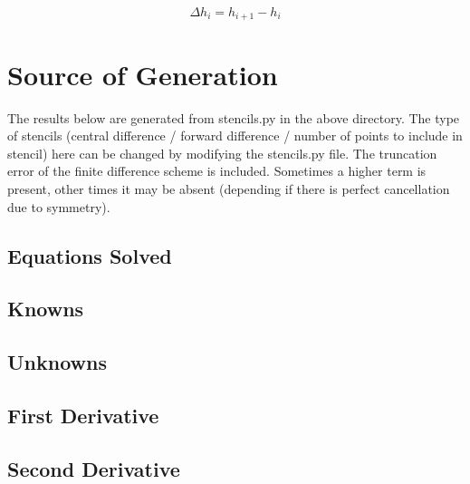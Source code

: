 \documentclass[11pt]{article}
\begin{document}
\begin{equation}
	\boxed{
	\Delta h_{i}
	=
	h_{i+1} - h_{i}
	}
\end{equation}

\section{Source of Generation}
The results below are generated from stencils.py in the above directory. The type of stencils (central difference / forward difference / number of points to include in stencil) here can be changed by modifying the stencils.py file. The truncation error of the finite difference scheme is included. Sometimes a higher term is present, other times it may be absent (depending if there is perfect cancellation due to symmetry).

\subsection{Equations Solved}

\subsection{Knowns}

\subsection{Unknowns}

\subsection{First Derivative}

\subsection{Second Derivative}

\end{document}
